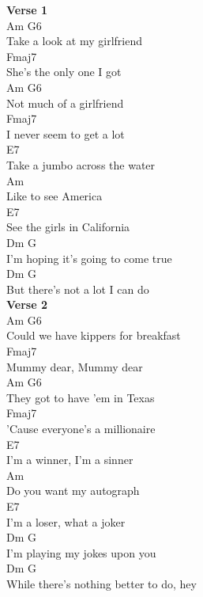 \documentclass[a4paper]{article}
\begin{document}
    {
        \scriptsize
        \textbf{Verse 1}
        ~\\
        {
            \cutive
            \obeyspaces
Am                  G6
\\
  Take a look at my girlfriend
\\
Fmaj7
\\
She's the only one I got
\\
Am              G6
\\
  Not much of a girlfriend
\\
  Fmaj7
\\
I never seem to get a lot
\\
E7
\\
  Take a jumbo across the water
\\
Am
\\
Like to see America
\\
 E7
\\
   See the girls in California
\\
    Dm                        G
\\
I'm hoping it's going to come true
\\
            Dm              G
\\
But there's not a lot I can do
\\

        }
        \textbf{Verse 2}
        ~\\
        {
            \cutive
            \obeyspaces
Am                        G6
\\
Could we have kippers for breakfast
\\
Fmaj7
\\
Mummy dear, Mummy dear
\\
Am                        G6
\\
  They got to have 'em in Texas
\\
       Fmaj7
\\
'Cause everyone's a millionaire
\\
E7
\\
  I'm a winner, I'm a sinner
\\
       Am
\\
Do you want my autograph
\\
E7
\\
  I'm a loser, what a joker
\\
    Dm                    G
\\
I'm playing my jokes upon you
\\
              Dm                G
\\
While there's nothing better to do, hey
\\

}}
\end{document}
